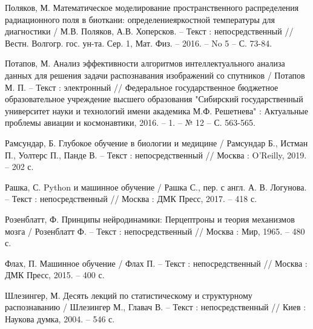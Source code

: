 \begin{thebibliography}{3}
	 Поляков, М. Математическое моделирование пространственного распределения радиационного поля в биоткани: определениеяркостной температуры для диагностики / М.В. Поляков, А.В. Хоперсков. -- Текст : непосредственный // Вестн. Волгогр. гос. ун-та. Сер. 1, Мат. Физ. -- 2016. -- No 5 -- С. 73-84.
	
	 Потапов, М. Анализ эффективности алгоритмов интеллектуального анализа данных для решения задачи распознавания изображений со спутников / Потапов М. П. -- Текст : электронный // Федеральное государственное бюджетное образовательное учреждение высшего образования "Сибирский государственный университет науки и технологий имени академика М.Ф. Решетнева" : Актуальные проблемы авиации и космонавтики, 2016. -- 1. -- № 12 -- С. 563-565.	
	
	 Рамсундар, Б. Глубокое обучение в биологии и медицине / Рамсундар Б., Истман П., Уолтерс П., Панде В. -- Текст : непосредственный // Москва : O'Reilly, 2019. -- 202 с.		
	
	 Рашка, С. Python и машинное обучение / Рашка С., пер. с англ. А. В. Логунова. -- Текст : непосредственный // Москва : ДМК Пресс, 2017. -- 418 с.		
	
	 Розенблатт, Ф. Принципы нейродинамики: Перцептроны и теория механизмов мозга / Розенблатт Ф. -- Текст : непосредственный // Москва : Мир, 1965. -- 480 с.	
	
	 Флах, П. Машинное обучение / Флах П. -- Текст : непосредственный // Москва : ДМК Пресс, 2015. -- 400 с.
	
	 Шлезингер, М. Десять лекций по статистическому и структурному распознаванию / Шлезингер М., Главач В. -- Текст : непосредственный // Киев : Наукова думка, 2004. -- 546 с.
	
\end{thebibliography}